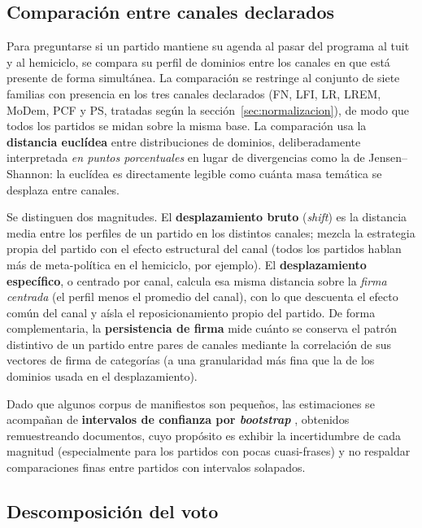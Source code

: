 \subsection{Comparación entre canales declarados}
\label{sec:metricas-cross-channel}

Para preguntarse si un partido mantiene su agenda al pasar del programa al tuit y
al hemiciclo, se compara su perfil de dominios entre los canales en que está
presente de forma simultánea. La comparación se restringe al conjunto de siete
familias con presencia en los tres canales declarados (FN, LFI, LR, LREM,
MoDem, PCF y PS, tratadas según la sección~\ref{sec:normalizacion}), de modo
que todos los partidos se midan sobre la misma base. La comparación usa la
\textbf{distancia euclídea}
entre distribuciones de dominios, deliberadamente interpretada \emph{en puntos
porcentuales} en lugar de divergencias como la de Jensen--Shannon: la euclídea es
directamente legible como cuánta masa temática se desplaza entre canales.

Se distinguen dos magnitudes. El \textbf{desplazamiento bruto} (\emph{shift}) es
la distancia media entre los perfiles de un partido en los distintos canales;
mezcla la estrategia propia del partido con el efecto estructural del canal
(todos los partidos hablan más de meta-política en el hemiciclo, por ejemplo). El
\textbf{desplazamiento específico}, o centrado por canal, calcula esa misma
distancia sobre la \emph{firma centrada}
(el perfil menos el promedio del canal), con lo que descuenta el efecto común del
canal y aísla el reposicionamiento propio del partido. De forma complementaria,
la \textbf{persistencia de firma} mide cuánto se conserva el patrón distintivo de
un partido entre pares de canales mediante la correlación de sus vectores de
firma de categorías (a una granularidad más fina que la de los dominios usada en
el desplazamiento).

Dado que algunos corpus de manifiestos son pequeños, las estimaciones se
acompañan de \textbf{intervalos de confianza por \emph{bootstrap}}
\cite{efron1979bootstrap}, obtenidos remuestreando documentos, cuyo propósito es
exhibir la incertidumbre de cada magnitud (especialmente para los partidos con
pocas cuasi-frases) y no respaldar comparaciones finas entre partidos con
intervalos solapados.

\subsection{Descomposición del voto}
\label{sec:metricas-descomposicion}

